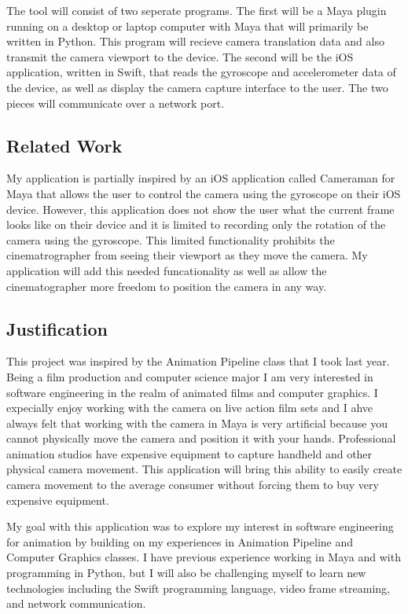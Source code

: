 \documentclass[11pt]{article}
\numberwithin{page}{section}%
\begin{document}
The tool will consist of two seperate programs. The first will be a Maya plugin running on a desktop or laptop computer with Maya that will primarily be written in Python. This program will recieve camera translation data and also transmit the camera viewport to the device. The second will be the iOS application, written in Swift, that reads the gyroscope and accelerometer data of the device, as well as display the camera capture interface to the user. The two pieces will communicate over a network port.

\subsection{Related Work}
My application is partially inspired by an iOS application called Cameraman for Maya that allows the user to control the camera using the gyroscope on their iOS device. However, this application does not show the user what the current frame looks like on their device and it is limited to recording only the rotation of the camera using the gyroscope. This limited functionality prohibits the cinematrographer from seeing their viewport as they move the camera. My application will add this needed funcationality as well as allow the cinematographer more freedom to position the camera in any way.

\subsection{Justification}
This project was inspired by the Animation Pipeline class that I took last year. Being a film production and computer science major I am very interested in software engineering in the realm of animated films and computer graphics. I expecially enjoy working with the camera on live action film sets and I ahve always felt that working with the camera in Maya is very artificial because you cannot physically move the camera and position it with your hands. Professional animation studios have expensive equipment to capture handheld and other physical camera movement. This application will bring this ability to easily create camera movement to the average consumer without forcing them to buy very expensive equipment. 

My goal with this application was to explore my interest in software engineering for animation by building on my experiences in Animation Pipeline and Computer Graphics classes. I have previous experience working in Maya and with programming in Python, but I will also be challenging myself to learn new technologies including the Swift programming language, video frame streaming, and network communication.

\clearpage
{}

\end{document}
